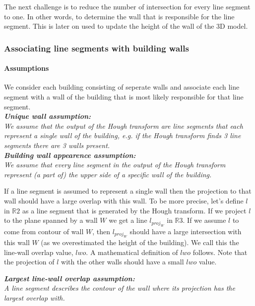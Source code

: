 	The next challenge is to reduce the number of intersection for every line
	segment to one. In other words, to determine the wall that is responsible for
	the line segment. This is later on used to update the height of the wall of the
	3D model.\\


\subsubsection{Associating line segments with building walls}
	\paragraph{Assumptions}
	We consider each building consisting of seperate walls and associate each
	line segment with a wall of the building that is most likely responsible for
	that line segment. \\
		
	\textbf{	\emph{Unique wall assumption:}}\\
	\emph{We assume that the output of the Hough transform are line segments
	that each represent a single wall of the building, e.g. if the Hough
	transform finds 3 line segments there are 3 walls present.}\\

	\textbf{	\emph{Building wall appearence assumption:}}\\
	\emph{We assume that every line segment in the output of the Hough transform represent (a part of) the upper side of
	a specific wall of the building.}

	If a line segment is assumed to represent a single wall then the projection
	to that wall should have a large overlap with this wall.  To be more
	precise, let's define $l$ in $\mathbb{R}2$ as a line segment that is
	generated by the Hough transform.  If we project $l$ to the plane spanned
	by a wall $W$ we get a line $l_{proj_W}$ in $\mathbb{R}3$.  If we assume
	$l$ to come from contour of wall $W$, then $l_{proj_W}$ should have a large
	intersection with this wall $W$ (as we overestimated the height of the
	building). We call this the line-wall overlap value, $lwo$.  A mathematical
	definition of $lwo$ follows.  Note that the projection of $l$ with the
	other walls should have a small $lwo$ value.

	\textbf{	\emph{Largest line-wall overlap assumption:}}\\
	\emph{A line segment describes the contour of the wall where its projection
	has the largest overlap with.}\\

